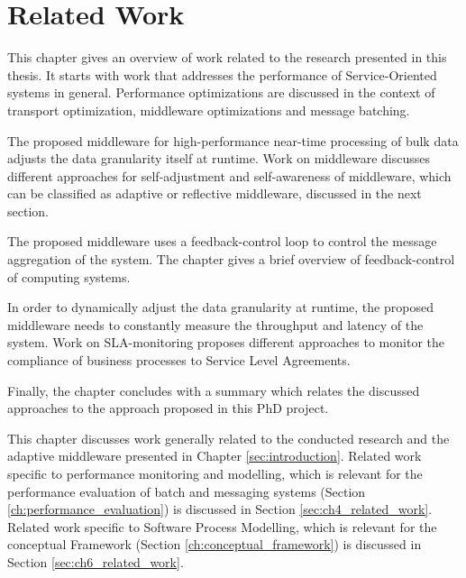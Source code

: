 \chapter{Related Work}\label{ch:related_work}

This chapter gives an overview of work related to the research presented in this thesis. It starts with work that addresses the performance of Service-Oriented systems in general. Performance optimizations are discussed in the context of transport optimization, middleware optimizations and message batching.

The proposed middleware for high-performance near-time processing of bulk data adjusts the data granularity itself at runtime. Work on middleware discusses different approaches for self-adjustment and self-awareness of middleware, which can be classified as adaptive or reflective middleware, discussed in the next section.

The proposed middleware uses a feedback-control loop to control the message aggregation of the system. The chapter gives a brief overview of feedback-control of computing systems.

In order to dynamically adjust the data granularity at runtime, the proposed middleware needs to constantly measure the throughput and latency of the system. Work on SLA-monitoring proposes different approaches to monitor the compliance of business processes to Service Level Agreements.

Finally, the chapter concludes with a summary which relates the discussed approaches to the approach proposed in this PhD project.

This chapter discusses work generally related to the conducted research and the adaptive middleware presented in Chapter \ref{sec:introduction}.
Related work specific to performance monitoring and modelling, which is relevant for the performance evaluation of batch and messaging systems (Section \ref{ch:performance_evaluation}) is discussed in Section \ref{sec:ch4_related_work}.
Related work specific to Software Process Modelling, which is relevant for the conceptual Framework (Section \ref{ch:conceptual_framework}) is discussed in Section \ref{sec:ch6_related_work}.

